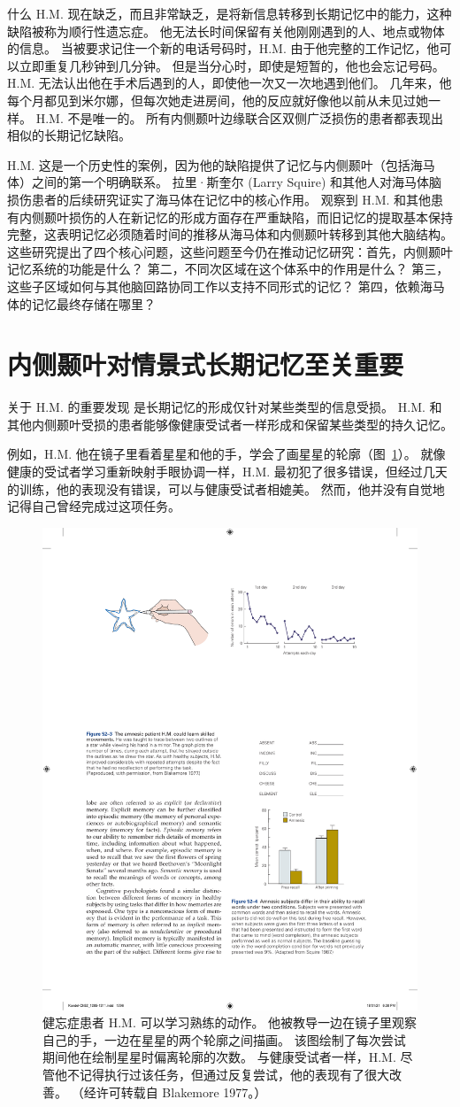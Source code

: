 什么 H.M. 现在缺乏，而且非常缺乏，是将新信息转移到长期记忆中的能力，这种缺陷被称为顺行性遗忘症。
他无法长时间保留有关他刚刚遇到的人、地点或物体的信息。
当被要求记住一个新的电话号码时，H.M. 由于他完整的工作记忆，他可以立即重复几秒钟到几分钟。
但是当分心时，即使是短暂的，他也会忘记号码。
H.M. 无法认出他在手术后遇到的人，即使他一次又一次地遇到他们。
几年来，他每个月都见到米尔娜，但每次她走进房间，他的反应就好像他以前从未见过她一样。
H.M. 不是唯一的。
所有内侧颞叶边缘联合区双侧广泛损伤的患者都表现出相似的长期记忆缺陷。


H.M. 这是一个历史性的案例，因为他的缺陷提供了记忆与内侧颞叶（包括海马体）之间的第一个明确联系。
拉里·斯奎尔 (Larry Squire) 和其他人对海马体脑损伤患者的后续研究证实了海马体在记忆中的核心作用。
观察到 H.M. 和其他患有内侧颞叶损伤的人在新记忆的形成方面存在严重缺陷，而旧记忆的提取基本保持完整，这表明记忆必须随着时间的推移从海马体和内侧颞叶转移到其他大脑结构。
这些研究提出了四个核心问题，这些问题至今仍在推动记忆研究：首先，内侧颞叶记忆系统的功能是什么？
第二，不同次区域在这个体系中的作用是什么？
第三，这些子区域如何与其他脑回路协同工作以支持不同形式的记忆？
第四，依赖海马体的记忆最终存储在哪里？



\section{内侧颞叶对情景式长期记忆至关重要}

关于 H.M. 的重要发现 是长期记忆的形成仅针对某些类型的信息受损。
H.M. 和其他内侧颞叶受损的患者能够像健康受试者一样形成和保留某些类型的持久记忆。


例如，H.M. 他在镜子里看着星星和他的手，学会了画星星的轮廓（图~\ref{fig:52_3}）。
就像健康的受试者学习重新映射手眼协调一样，H.M. 最初犯了很多错误，但经过几天的训练，他的表现没有错误，可以与健康受试者相媲美。
然而，他并没有自觉地记得自己曾经完成过这项任务。


\begin{figure}[htbp]
	\centering
	\includegraphics[width=0.5\linewidth]{chap52/fig_52_3}
	\caption{健忘症患者 H.M. 可以学习熟练的动作。 他被教导一边在镜子里观察自己的手，一边在星星的两个轮廓之间描画。 该图绘制了每次尝试期间他在绘制星星时偏离轮廓的次数。 与健康受试者一样，H.M. 尽管他不记得执行过该任务，但通过反复尝试，他的表现有了很大改善。 （经许可转载自 Blakemore 1977。）}
	\label{fig:52_3}
\end{figure}


